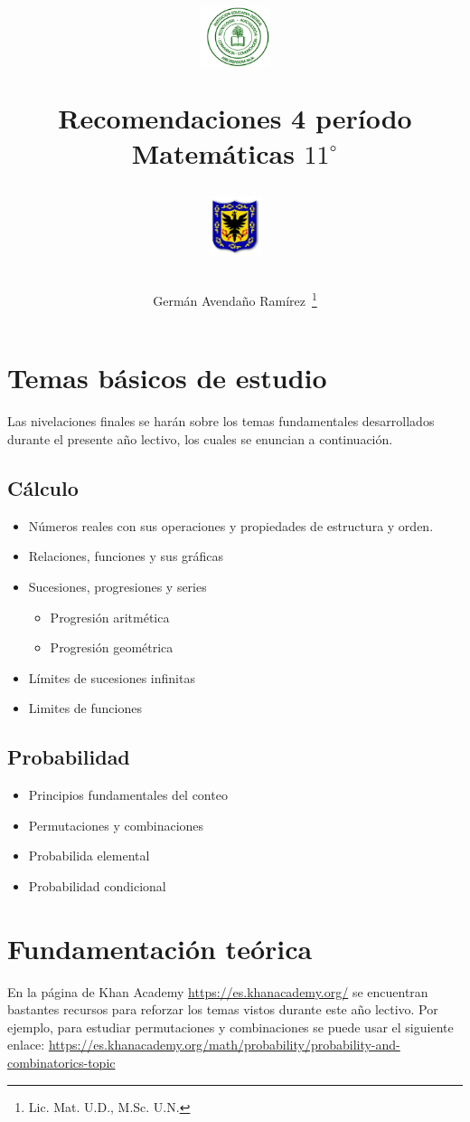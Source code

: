 \documentclass[letterpaper,11pt,twoside]{article}
\author{Germ\'an Avenda\~no Ram\'irez~\thanks{Lic. Mat. U.D., M.Sc. U.N.}}
\title{\begin{minipage}{.2\textwidth}
\includegraphics[height=1.75cm]{Images/logo-colegio.png}\end{minipage}
\begin{minipage}{.55\textwidth}
\begin{center}
Recomendaciones 4 período\\
Matemáticas $11^{\circ}$
\end{center}
\end{minipage}\hfill
\begin{minipage}{.2\textwidth}
\includegraphics[height=1.75cm]{Images/logo-sed.png} 
\end{minipage}}
\date{}
\begin{document}
\maketitle
\section*{Temas básicos de estudio}
Las nivelaciones finales se harán sobre los temas fundamentales desarrollados durante el presente año lectivo, los cuales se enuncian a continuación.
\subsection*{Cálculo}
\begin{itemize}
\item Números reales con sus operaciones y propiedades de estructura y orden.
\item Relaciones, funciones y sus gráficas
\item Sucesiones, progresiones y series
\begin{itemize}
\item Progresión aritmética
\item Progresión geométrica
\end{itemize}
\item Límites de sucesiones infinitas
\item Limites de funciones
\end{itemize}
\subsection*{Probabilidad}
\begin{itemize}
\item Principios fundamentales del conteo
\item Permutaciones y combinaciones
\item Probabilida elemental
\item Probabilidad condicional
\end{itemize}
\section*{Fundamentación teórica}
En la página de Khan Academy \url{https://es.khanacademy.org/} se encuentran bastantes recursos para reforzar los temas vistos durante este año lectivo. Por ejemplo, para estudiar permutaciones y combinaciones se puede usar el siguiente enlace:
\url{https://es.khanacademy.org/math/probability/probability-and-combinatorics-topic}
\end{document}
